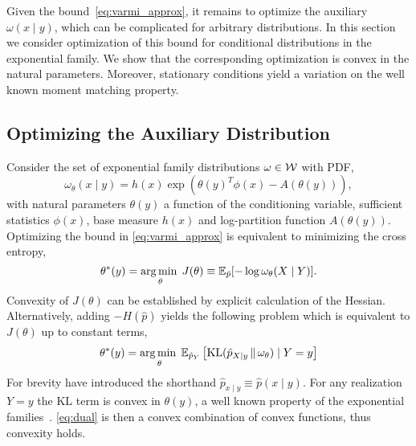 Given the bound~\eqref{eq:varmi_approx}, it remains to optimize 
the auxiliary $\omega(x\mid y)$, which can be complicated
for arbitrary distributions.  In this section we consider optimization
of this bound for conditional distributions in the exponential family.
We show that the corresponding optimization is convex in the natural
parameters.  Moreover, stationary conditions yield a variation on the
well known moment matching property.



\subsection{Optimizing the Auxiliary Distribution}

Consider the set of exponential family distributions
$\omega \in \mathcal{W}$ with PDF,
\begin{equation}
  \omega_\theta(x \mid y) = h(x)\exp\left( \theta(y)^T \phi(x) - A(\theta(y)) \right),
\end{equation}
with natural parameters $\theta(y)$ a function of the conditioning
variable, sufficient statistics $\phi(x)$, base measure $h(x)$ and
log-partition function $A(\theta(y))$.
Optimizing the bound in \EQN\eqref{eq:varmi_approx} is equivalent to minimizing the
cross entropy,
\begin{equation}\label{eq:crossent}
  \theta^{*}(y) = \operatorname*{arg\,min\;}_{\theta} J(\theta) \equiv \mathbb{E}_{\hat{p}}[ - \log \omega_{\theta}(X \mid Y) ].
\end{equation}
Convexity of $J(\theta)$ can be established by explicit calculation of
the Hessian.  Alternatively, adding \mbox{$-H(\hat{p})$} yields the
following problem which is equivalent to $J(\theta)$ up to constant
terms,
\begin{equation}\label{eq:dual}
  \theta^*(y) = \operatorname*{arg\,min\;}_\theta \mathbb{E}_{\hat{p}_Y}\left[ \mathrm{KL}(\hat{p}_{X\mid y}\,\|\,\omega_\theta) \mid Y=y \right]
\end{equation}
For brevity have introduced the shorthand \mbox{$\hat{p}_{x\mid y} \equiv
\hat{p}(x\mid y)$}.  For any realization $Y=y$ the KL term is convex in
$\theta(y)$, a well known property of the exponential
families~\citep{wainwright_jordan}.  \EQN\eqref{eq:dual} is then a
convex combination of convex functions, thus convexity holds.

